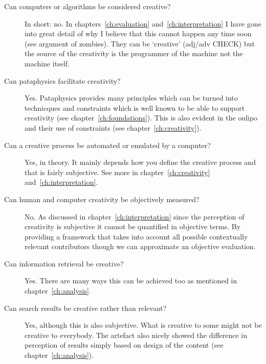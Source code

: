 \begin{description}
  \item[Can computers or algorithms be considered creative?] In short: no. In chapters~\ref{ch:evaluation} and~\ref{ch:interpretation} I have gone into great detail of why I believe that this cannot happen any time soon (see argument of zombies). They can be `creative' (adj/adv CHECK) but the source of the creativity is the programmer of the machine not the machine itself.
  \item[Can pataphysics facilitate creativity?] Yes. Pataphysics provides many principles which can be turned into technicques and constraints which is well known to be able to support creativity (see chapter~\ref{ch:foundations}). This is also evident in the \gls{oulipo} and their use of constraints (see chapter~\ref{ch:creativity}).
  \item[Can a creative process be automated or emulated by a computer?] Yes, in theory. It mainly depends how you define the creative process and that is fairly subjective. See more in chapter~\ref{ch:creativity} and~\ref{ch:interpretation}.
  \item[Can human and computer creativity be objectively measured?] No. As discussed in chapter~\ref{ch:interpretation} since the perception of creativity is subjective it cannot be quantified in objective terms. By providing a framework that takes into account all possible contextually relevant contributors though we can approximate an objective evaluation.
  \item[Can information retrieval be creative?] Yes. There are many ways this can be achieved too as mentioned in chapter~\ref{ch:analysis}.
  \item[Can search results be creative rather than relevant?] Yes, although this is also subjective. What is creative to some might not be creative to everybody. The artefact also nicely showed the difference in perception of results simply based on design of the content (see chapter~\ref{ch:analysis}).
\end{description}



